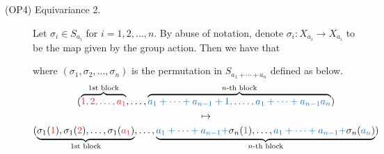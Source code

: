 \begin{definition}
\begin{description}
    \item[(OP4) Equivariance 2.]
    Let $\sigma_i \in S_{a_i}$ for $i = 1, 2, \dots, n$. 
    By abuse of notation, denote $\sigma_i: X_{a_i} \to X_{a_i}$ to 
    be the map given by the group action.
    Then we have that 
    \begin{center}
    \end{center}
    where $(\sigma_1, \sigma_2, \dots, \sigma_n)$ is the permutation in $S_{a_1 + \cdots + a_n}$
    defined as below.
    \begin{gather*}
        (\overbrace{\textcolor{Red}{1, 2, \dots, a_1}}^{\text{1st block}}
        ,\dots,
        \overbrace{\textcolor{RoyalBlue}{a_1 + \cdots + a_{n-1}+ 1,, \dots, a_1 + \cdots + a_{n-1}a_n}}^{n\text{-th block}} )
        \\
        \mapsto\\
        (\underbrace{\sigma_1(\textcolor{Red}{1}), \sigma_1(\textcolor{Red}{2}), \dots, \sigma_1(\textcolor{Red}{a_1})}_{\text{1st block}}, 
        \dots, 
        \underbrace{\textcolor{RoyalBlue}{a_1 + \cdots +  a_{n-1}+}
        \sigma_n(\textcolor{RoyalBlue}{1}), 
        \dots, \textcolor{RoyalBlue}{a_1 + \cdots +  a_{n-1}+}\sigma_n(\textcolor{RoyalBlue}{a_n})
        }_{n\text{-th block}}
        )
    \end{gather*}
    \end{description}
\end{definition}

